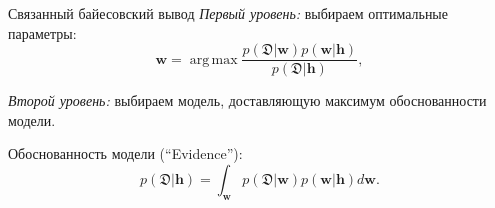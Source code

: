 \documentclass[usenames,dvipsnames,10pt,pdf,utf8,russian,aspectratio=43]{beamer}
\DeclareMathOperator*{\argmax}{arg\,max}
\begin{document}
\begin{frame}{Связанный байесовский вывод}
\textit{Первый уровень:} выбираем оптимальные параметры:
\[
    \mathbf{w} = \argmax \frac{p(\mathfrak{D}|\mathbf{w})p(\mathbf{w}|\mathbf{h})}{p(\mathfrak{D}|\mathbf{h})},
\]

\textit{Второй уровень:} выбираем модель, доставляющую максимум обоснованности модели.

Обоснованность модели (``Evidence''):
\[
	p(\mathfrak{D}|\mathbf{h}) = \int_\mathbf{w} p(\mathfrak{D}|\mathbf{w})p(\mathbf{w}|\mathbf{h}) d\mathbf{w}.
\]


\begin{figure}
  \centering
\label{fig:1}\qquad

\end{figure}


\end{frame}
\end{document}
